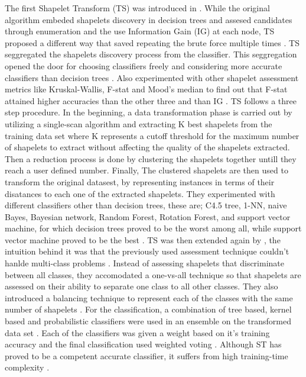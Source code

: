 The first Shapelet Transform (TS) was introduced in \cite{hills2014classification}.
While the original algorithm embeded shapelets discovery in decision trees and assesed candidates through enumeration and 
the use Information Gain (IG) at each node, TS proposed a different way that saved repeating the brute force multiple times \cite{bostrom2018shapelet}.
TS seggregated the shapelets discovery process from the classifier. This seggregation opened the door for choosing classifiers freely and considering more accurate
classifiers than decision trees \cite{bagnall2017great,lines2015time}. Also \cite{hills2014classification} experimented with other shapelet assessment metrics like Kruskal-Wallis, F-stat and Mood’s median
to find out that F-stat attained higher accuracies than the other three and than IG \cite{bostrom2018shapelet}.\newline
TS follows a three step procedure. In the beginning, a data transformation phase is carried out by utilizing a single-scan algorithm and extracting K best shapelets from the training
data set where K represents a cutoff threshold for the maximum number of shapelets to extract without affecting the quality of the shapelets extracted.
Then a reduction process is done by clustering the shapelets together untill they reach a user defined number.
Finally, The clustered shapelets are then used to transform the original datasest, by representing instances in terms of their disatances to each one of the extracted shapelets.
They experimented with different classifiers other than decision trees, these are; C4.5 tree, 1-NN, naive Bayes, Bayesian network, Random Forest, Rotation Forest, and support vector machine,
for which decision trees proved to be the worst among all, while support vector machine proved to be the best \cite{hills2014classification}.\newline
TS was then extended again by \cite{Bostrom2017}, the intuition behind it was that the previously used assessment technique couldn't hanlde multi-class problems \cite{Bostrom2017}.
Instead of assessing shapelets that discriminate between all classes, they accomodated a one-vs-all technique so that shapelets are assessed on their ability to separate one class to all other classes.
They also introduced a balancing technique to represent each of the classes with the same number of shapelets \cite{bagnall2017great}.
For the classification, a combination of tree based, kernel based and probabilistic classifiers were used in an ensemble on the transformed data set \cite{shifaz2020ts,lines2018time}.
Each of the classifiers was given a weight based on it's training accuracy and the final classification used weighted voting \cite{Bostrom2017}.
Although ST has proved to be a competent accurate classifier, it suffers from high training-time complexity \cite{shifaz2020ts}.